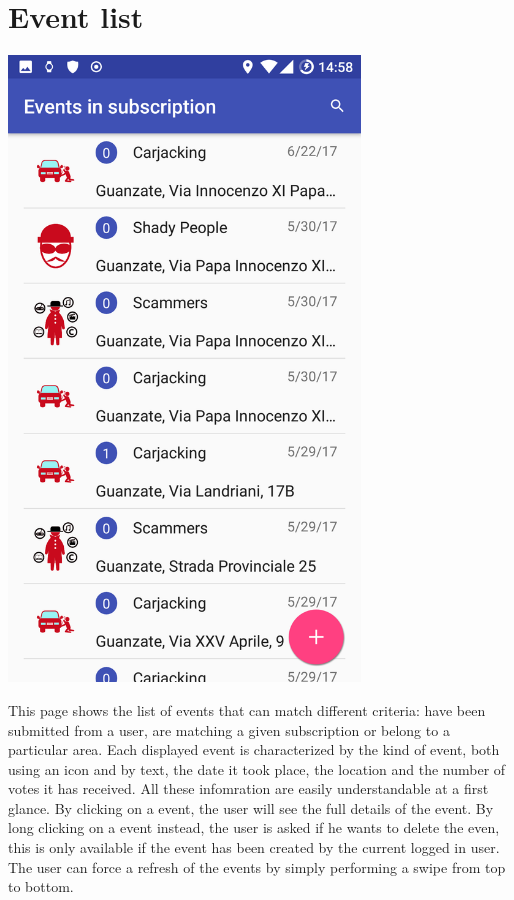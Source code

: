 \documentclass[a4paper]{scrreprt}
\begin{document}
\section{Event list}
\begin{minipage}{0.5\textwidth}
	\centering
	\includegraphics[width=0.7\textwidth]{event_list}
\end{minipage}
\begin{minipage}{0.5\textwidth}
	This page shows the list of events that can match different criteria: have been submitted from a user, are matching a given subscription or belong to a particular area. Each displayed event is characterized by the kind of event, both using an icon and by text, the date it took place, the location and the number of votes it has received. All these infomration are easily understandable at a first glance. By clicking on a event, the user will see the full details of the event. By long clicking on a event instead, the user is asked if he wants to delete the even, this is only available if the event has been created by the current logged in user. The user can force a refresh of the events by simply performing a swipe from top to bottom. 
\end{minipage}
\end{document}
